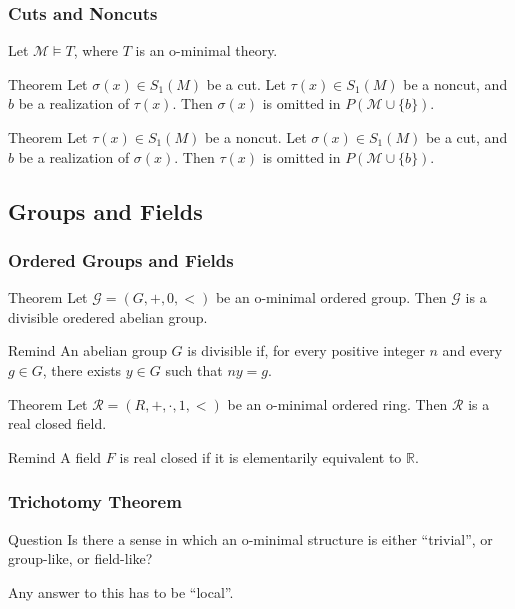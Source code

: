 \begin{frame}[c]\frametitle{Cuts and Noncuts}

	Let $\mathcal{M} \vDash T$, where $T$ is an o-minimal theory.
    \break
    \break
	\begin{beamerboxesrounded}[shadow=true]{Theorem}
		Let $\sigma (x) \in S_1 (M)$ be a cut. 
		Let $\tau (x) \in S_1 (M)$ be a noncut, and $b$ be a realization of $\tau (x)$.
		Then $\sigma (x)$ is omitted in $P(\mathcal{M} \cup \{b\})$.
	\end{beamerboxesrounded}

	\begin{beamerboxesrounded}[shadow=true]{Theorem}
		Let $\tau (x) \in S_1 (M)$ be a noncut. 
		Let $\sigma (x) \in S_1 (M)$ be a cut, and $b$ be a realization of $\sigma (x)$.
		Then $\tau (x)$ is omitted in $P(\mathcal{M} \cup \{b\})$.
	\end{beamerboxesrounded}

\end{frame}

\subsection{Groups and Fields}

\begin{frame}[t]\frametitle{Ordered Groups and Fields}
    
	\begin{beamerboxesrounded}[shadow=true]{Theorem}
		Let $\mathcal{G}=(G,+,0,<)$ be an o-minimal ordered group. 
		Then $\mathcal{G}$ is a divisible oredered abelian group.
	\end{beamerboxesrounded}

	\begin{beamerboxesrounded}[shadow=true]{Remind}
		An abelian group $G$ is divisible if, for every positive integer $n$ and every $g \in G$, there exists $y \in G$ such that $ny = g$.
	\end{beamerboxesrounded}

	\begin{beamerboxesrounded}[shadow=true]{Theorem}
		Let $\mathcal{R}=(R,+,\cdot,1,<)$ be an o-minimal ordered ring. 
		Then $\mathcal{R}$ is a real closed field.
	\end{beamerboxesrounded}

	\begin{beamerboxesrounded}[shadow=true]{Remind}
		A field $F$ is real closed if it is elementarily equivalent to $\mathbb{R}$.
	\end{beamerboxesrounded}

\end{frame}

\begin{frame}[t]\frametitle{Trichotomy Theorem}
    
	\begin{beamerboxesrounded}[shadow=true, upper=question]{Question}
		Is there a sense in which an o-minimal structure is either ``trivial'', or group-like, or field-like?
	\end{beamerboxesrounded}

	Any answer to this has to be ``local''.

\end{frame}